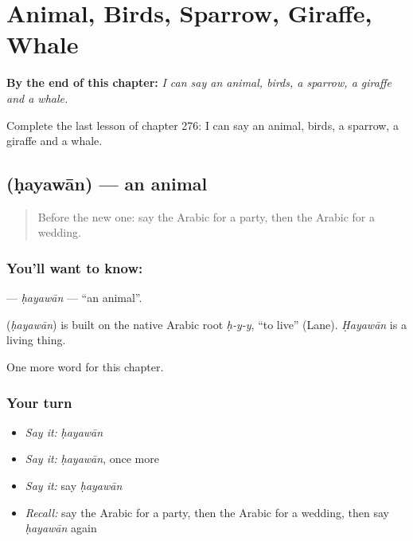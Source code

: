 
\chapter{Animal, Birds, Sparrow, Giraffe, Whale}
\label{ch:ar-animal-birds-sparrow-giraffe-whale}

\begin{chapteropening}
\textbf{By the end of this chapter:} \emph{I can say an animal, birds, a sparrow, a giraffe and a whale.}

Complete the last lesson of chapter 276: I can say an animal, birds, a sparrow, a giraffe and a whale.
\end{chapteropening}

\section[\texorpdfstring{\ar{حيوان} (ḥayawān)}{حيوان (ḥayawān)}]{ (ḥayawān) — an animal}

\label{lesson:AR-C276-hayawan}



\begin{quote}
Before the new one: say the Arabic for a party, then the Arabic for a wedding.
\end{quote}

\subsection*{You'll want to know: }
\textbf{} — \emph{ḥayawān} — \textquotedblleft{}an animal\textquotedblright{}.

\begin{cousinweb}
\textbf{} (\emph{ḥayawān}) is built on the native Arabic root \emph{ḥ-y-y}, \textquotedblleft{}to live\textquotedblright{} (Lane). \emph{Ḥayawān} is a living thing.
\end{cousinweb}

\begin{grammarlens}[title={What you've built}]
One more word for this chapter.
\end{grammarlens}

\subsection*{Your turn}
\begin{itemize}
\raggedright
  \item \emph{Say it:} \emph{ḥayawān}
  \item \emph{Say it:} \emph{ḥayawān}, once more
  \item \emph{Say it:} say \emph{ḥayawān}
  \item \emph{Recall:} say the Arabic for a party, then the Arabic for a wedding, then say \emph{ḥayawān} again
\end{itemize}

